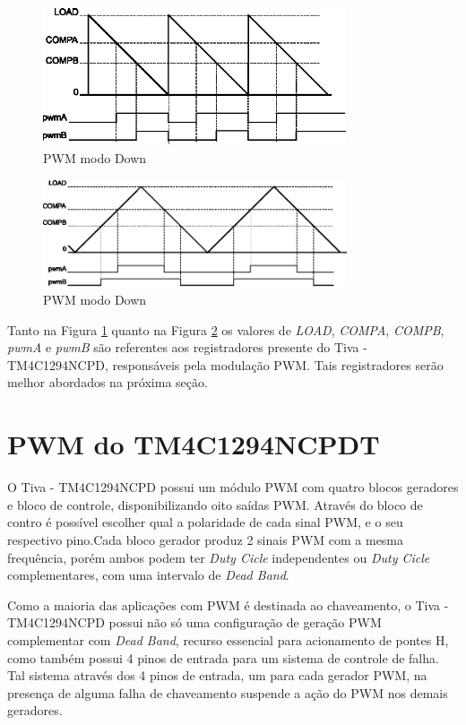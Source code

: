 \begin{figure}[H]
	\centering
\includegraphics[width=0.8\textwidth] {figuras/Down.eps}
	\caption{PWM modo Down \cite{DATASHEET_TIVA}}
	\label{fig:Down}
\end{figure}

\begin{figure}[H]
	\centering
	\includegraphics[width=0.8\textwidth] {figuras/UpDown.eps}
	\caption{PWM modo Down \cite{DATASHEET_TIVA}}
	\label{fig:UpDown}
\end{figure}

Tanto na Figura \ref{fig:Down} quanto na Figura \ref{fig:UpDown} os valores de \emph{LOAD}, \emph{COMPA}, \emph{COMPB}, \emph{pwmA} e \emph{pwmB} são referentes aos registradores presente do Tiva - TM4C1294NCPD, responsáveis pela modulação PWM. Tais registradores serão melhor abordados na próxima seção.  

\section{PWM do TM4C1294NCPDT}

O Tiva - TM4C1294NCPD possui um módulo PWM com quatro blocos geradores e bloco de controle, disponibilizando oito saídas PWM.  Através do bloco de contro é possível escolher qual a polaridade de cada sinal PWM, e o seu respectivo pino.Cada bloco gerador produz 2 sinais PWM com a mesma frequência, porém ambos podem ter \emph{Duty Cicle} independentes ou \emph{Duty Cicle} complementares, com uma intervalo de \emph{Dead Band}. 

Como a maioria das aplicações com PWM é destinada ao chaveamento, o Tiva - TM4C1294NCPD possui não só uma configuração de geração PWM complementar com \emph{Dead Band}, recurso essencial para acionamento de pontes H, como também possui 4 pinos de entrada para um sistema de controle de falha. Tal sistema através dos 4 pinos de entrada, um para cada gerador PWM, na presença de alguma falha de chaveamento suspende a ação do PWM nos demais geradores.

